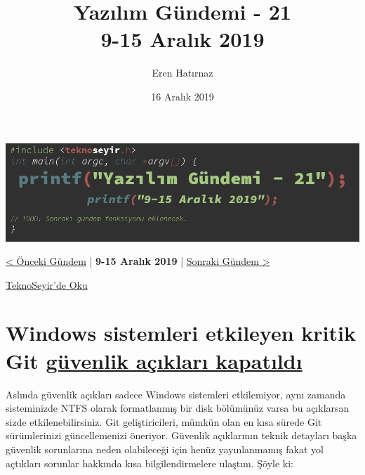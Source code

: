 \documentclass[11pt]{article}
\author{Eren Hatırnaz}
\date{16 Aralık 2019}
\title{Yazılım Gündemi - 21\\\medskip
\large 9-15 Aralık 2019}
\begin{document}
\maketitle
\tableofcontents \clearpage\shorthandoff{=}

\begin{center}
\includegraphics[width=.9\linewidth]{gorseller/yazilim-gundemi-banner.png}
\end{center}

\begin{center}
\href{../20/yazilim-gundemi-20.pdf}{< Önceki Gündem} | \textbf{9-15 Aralık 2019} | \href{../22/yazilim-gundemi-22.pdf}{Sonraki Gündem >}

\href{https://teknoseyir.com/blog/yazilim-gundemi-21-9-15-aralik-2019}{TeknoSeyir'de Oku}
\end{center}

\section{Windows sistemleri etkileyen kritik Git \href{https://github.blog/2019-12-10-multiple-git-vulnerabilities-in-2-24-and-older/}{güvenlik açıkları kapatıldı}}
\label{sec:orgc62081b}
Aslında güvenlik açıkları sadece Windows sistemleri etkilemiyor, aynı zamanda
sisteminizde NTFS olarak formatlanmış bir disk bölümünüz varsa bu açıklarsan
sizde etkilenebilirsiniz. Git geliştiricileri, mümkün olan en kısa sürede Git
sürümlerinizi güncellemenizi öneriyor. Güvenlik açıklarının teknik detayları
başka güvenlik sorunlarına neden olabileceği için henüz yayınlanmamış fakat yol
açtıkları sorunlar hakkında kısa bilgilendirmelere ulaştım. Şöyle ki:
\end{document}
